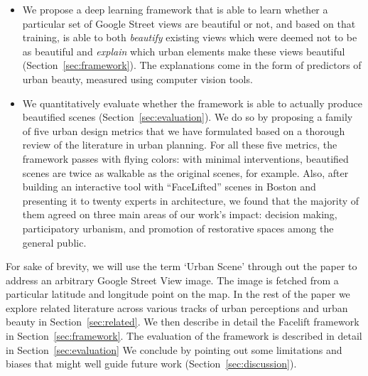 \begin{itemize}
\item We propose a deep learning framework that is able to learn whether a particular set of Google Street views are beautiful or not, and based on that training, is able to both \emph{beautify} existing views which were deemed not to be as beautiful and \emph{explain} which urban elements  make these views beautiful (Section~\ref{sec:framework}). The explanations come in the form of predictors of urban beauty, measured using computer vision tools.

\item We quantitatively evaluate whether the framework is able to actually produce beautified scenes (Section~\ref{sec:evaluation}). We do so by proposing a family of five urban design metrics that we have formulated based on a thorough review of the literature in urban planning. For all these five metrics, the framework passes with flying colors: with minimal interventions, beautified scenes are twice as walkable as the original scenes, for example. Also, after building an interactive tool with ``FaceLifted'' scenes in Boston and presenting it to twenty experts in architecture,  we found that the majority of them agreed on three main areas of our work's impact: decision making, participatory urbanism, and promotion of restorative spaces among the general public. 

\end{itemize}
For sake of brevity, we will use the term `Urban Scene' through out the paper to address an arbitrary Google Street View image. The image is fetched from a particular latitude and longitude point on the map. 
In the rest of the paper we explore related literature across various tracks of urban perceptions and urban beauty in Section~\ref{sec:related}. We then describe in detail the Facelift framework in Section~\ref{sec:framework}. The evaluation of the framework is described in detail in Section~\ref{sec:evaluation} We conclude by pointing out some limitations and biases that might well guide future work (Section~\ref{sec:discussion}).




